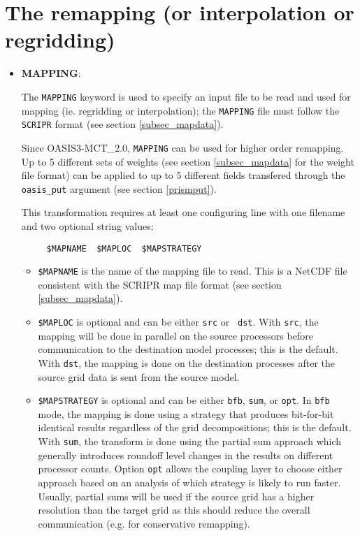 
\section{The remapping (or interpolation or regridding)}
\label{subsec_interp}

\begin{itemize}

\item {\bf MAPPING}:

  The {\tt MAPPING} keyword is used to specify an input file to be
  read and used for mapping (ie. regridding or interpolation); the
  {\tt MAPPING} file must follow the {\tt SCRIPR} format (see
    section \ref{subsec_mapdata}).
 
  Since OASIS3-MCT\_2.0, {\tt MAPPING} can be used for higher order
  remapping. Up to 5 different sets of weights (see section
  \ref{subsec_mapdata} for the weight file format) can be applied to
  up to 5 different fields transfered through the {\tt oasis\_put} argument
  (see section \ref{prismput}).

  This transformation requires at least one configuring line with one
  filename and two optional string values:
\begin{verbatim}
     $MAPNAME  $MAPLOC  $MAPSTRATEGY
\end{verbatim}
  \begin{itemize}
  \item {\tt \$MAPNAME} is the name of the mapping file to read.  This
    is a NetCDF file consistent with the SCRIPR map file format (see
    section \ref{subsec_mapdata}).

  \item {\tt \$MAPLOC} is optional and can be either {\tt src} or {\tt
      dst}.  With {\tt src}, the mapping will be done in parallel on
    the source processors before communication to the destination
    model processes; this is the default.  With {\tt dst}, the mapping
    is done on the destination processes after the source grid data is
    sent from the source model.

  \item {\tt \$MAPSTRATEGY} is optional and can be either {\tt bfb},
    {\tt sum}, or {\tt opt}.  In {\tt bfb} mode, the mapping is done
    using a strategy that produces bit-for-bit identical results
    regardless of the grid decompositions; this is the default.  With {\tt sum}, the
    transform is done using the partial sum approach which generally
    introduces roundoff level changes in the results on different
    processor counts. Option {\tt opt} allows the coupling layer to
    choose either approach based on an analysis of which strategy is
    likely to run faster. Usually, partial sums will be used if the
    source grid has a higher resolution than the target grid as this
    should reduce the overall communication (e.g. for conservative
    remapping).


\end{itemize}
\end{itemize}
